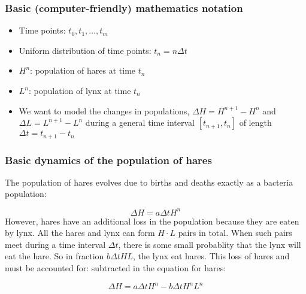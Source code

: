\documentclass{beamer}
\begin{document}
\begin{frame}
\frametitle{Basic (computer-friendly) mathematics notation}

\begin{block}{}
\begin{itemize}
 \item Time points: $t_0,t_1,\ldots,t_m$

 \item Uniform distribution of time points: $t_n=n\Delta t$

 \item $H^n$: population of hares at time $t_n$

 \item $L^n$: population of lynx at time $t_n$

 \item We want to model the changes in populations, $\Delta H=H^{n+1}-H^n$
   and $\Delta L=L^{n+1}-L^n$ during a general time interval $[t_{n+1},t_n]$
   of length $\Delta t=t_{n+1}-t_n$
\end{itemize}

\noindent
\end{block}
\end{frame}

\begin{frame}
\frametitle{Basic dynamics of the population of hares}

\begin{block}{}
The population of hares evolves due to births and deaths exactly as a bacteria population:

\[
\Delta H = a \Delta t H^n
\]
However, hares have an additional loss in the population because
they are eaten by lynx.
All the hares and lynx can form
$H\cdot L$ pairs in total. When such pairs meet during a time
interval $\Delta t$, there is some
small probablity that the lynx will eat the hare.
So in fraction $b\Delta t HL$, the lynx eat hares. This
loss of hares and must be accounted for:
subtracted in the equation for hares:

\[ \Delta H = a\Delta t H^n - b \Delta t H^nL^n\]
\end{block}
\end{frame}
\end{document}
